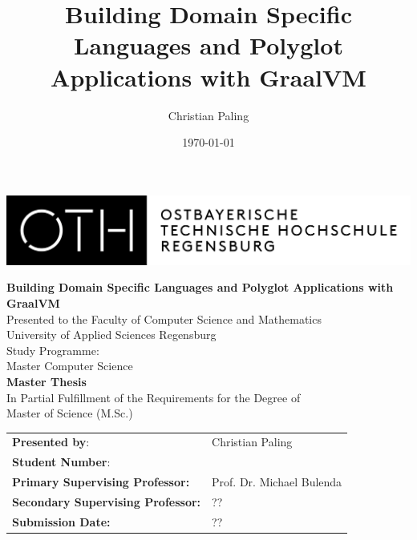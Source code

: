 \documentclass[12pt]{article}
\author{Christian Paling}
\date{\today}
\title{Building Domain Specific Languages and Polyglot Applications with GraalVM}
\begin{document}
\pagestyle{fancy}
\lhead{}
\chead{}
\rhead{\leftmark}
\lfoot{}
\cfoot{}
\renewcommand{\headrulewidth}{0.4pt}
\renewcommand{\footrulewidth}{0.4pt}

\newcommand{\sectionbreak}{\clearpage}


\thispagestyle{empty}

\includegraphics[width=.9\linewidth]{./img/oth-logo.png}

\begin{center}
\vspace*{2cm}
\Large
\textbf{Building Domain Specific Languages and Polyglot Applications with GraalVM} \\
\vspace*{2cm}
\large
Presented to the Faculty of Computer Science and Mathematics\\
University of Applied Sciences Regensburg\\
Study Programme: \\
Master Computer Science\\
\vspace*{2cm}
\Large
\textbf{Master Thesis} \\
\vspace*{1cm}
\large
In Partial Fulfillment of the Requirements for the Degree of \\
Master of Science (M.Sc.)
\vspace*{1cm}
\Large
\vfill
\normalsize
\begin{tabularx}{1.0\textwidth}{ >{\raggedleft\arraybackslash}X >{\raggedright\arraybackslash}X }
    \rule{0mm}{1ex}\textbf{Presented by}: & Christian Paling \\
    \rule{0mm}{1ex}\textbf{Student Number}: & 123456 \\[2em]
    \rule{0mm}{1ex}\textbf{Primary Supervising Professor:} & Prof. Dr. Michael Bulenda \\ 
    \rule{0mm}{1ex}\textbf{Secondary Supervising Professor:} & ?? \\[2em]
    \rule{0mm}{1ex}\textbf{Submission Date:} & ?? \\ 
\end{tabularx}
\end{center}
\pagebreak
\thispagestyle{empty}
\pagebreak
\end{document}
